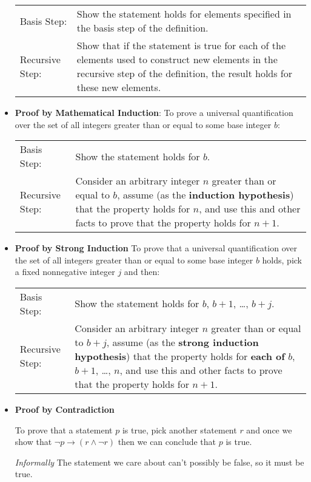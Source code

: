 \begin{itemize}
        \begin{tabularx}{\textwidth}{l X}
        Basis Step: & Show the statement holds for elements specified in the basis step of the definition. \\
        Recursive Step: & Show that if the statement is true for each of the elements used to construct
    new elements in the recursive step of the definition, the result holds for these new elements.
    \end{tabularx}
    
    \item {\bf Proof by Mathematical Induction}: To prove a universal quantification over the set of  all integers greater than  or  equal to some base integer $b$:
    
    \begin{tabularx}{\textwidth}{l X}
        Basis Step: & Show the statement holds for $b$. \\
        Recursive Step: & Consider an arbitrary integer $n$ greater than or  equal to  $b$, assume
        (as the {\bf induction hypothesis})  that the property holds  for $n$, and use  this and
        other facts to  prove that  the property holds for $n+1$.
    \end{tabularx}
    
    \item {\bf Proof by Strong Induction} To prove that a universal quantification over the set of all integers greater than or equal to some  base integer $b$ holds,  pick a  fixed nonnegative integer  $j$ and then: \hfill 
    
    \begin{tabularx}{\textwidth}{l X}
        Basis Step: & Show the statement holds for $b$, $b+1$, \ldots, $b+j$. \\
        Recursive Step: & Consider an arbitrary integer $n$ greater than or  equal to  $b+j$, assume
        (as the {\bf strong  induction hypothesis})  that the property holds  for {\bf each of} $b$, $b+1$, \ldots, $n$, 	
        and use  this and
        other facts to  prove that  the property holds for $n+1$.
    \end{tabularx}

    \item {\bf Proof by Contradiction} 

    To prove that a statement $p$ is true, pick another statement $r$ and once we show
    that $\neg p  \to (r \wedge  \neg r)$ then  we can conclude that  $p$ is  true.
    
    {\it Informally} The statement we care about can't possibly be false, so it must be true.
\end{itemize}

